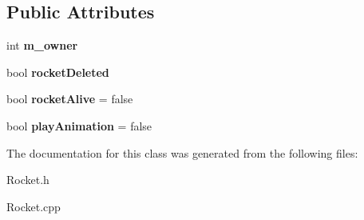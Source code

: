 \subsection*{Public Attributes}
\begin{DoxyCompactItemize}
\item 
int {\bfseries m\+\_\+owner}\hypertarget{class_rocket_a55306106a518d017932a0a4984bb36e1}{}\label{class_rocket_a55306106a518d017932a0a4984bb36e1}

\item 
bool {\bfseries rocket\+Deleted}\hypertarget{class_rocket_ad8581a1e66b9aad50affbe4dd7f04e31}{}\label{class_rocket_ad8581a1e66b9aad50affbe4dd7f04e31}

\item 
bool {\bfseries rocket\+Alive} = false\hypertarget{class_rocket_aab66b6f1610b85b3847ac79196a300c7}{}\label{class_rocket_aab66b6f1610b85b3847ac79196a300c7}

\item 
bool {\bfseries play\+Animation} = false\hypertarget{class_rocket_a0ddef6a76cd2f67cc460da282cd3cbb7}{}\label{class_rocket_a0ddef6a76cd2f67cc460da282cd3cbb7}

\end{DoxyCompactItemize}


The documentation for this class was generated from the following files\+:\begin{DoxyCompactItemize}
\item 
Rocket.\+h\item 
Rocket.\+cpp\end{DoxyCompactItemize}
